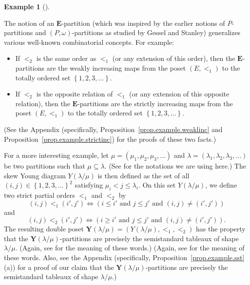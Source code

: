 \documentclass[numbers=enddot,12pt,final,onecolumn,notitlepage,abstracton]{scrartcl}
\theoremstyle{definition}
\newtheorem{exam}[theo]{Example}
\newenvironment{example}[1][]
{\begin{exam}[#1]\begin{leftbar}}
{\end{leftbar}\end{exam}}
\newenvironment{verlong}{}{}
\newenvironment{vershort}{}{}
\newcommand{\EE}{{\mathbf{E}}}
\begin{document}
\begin{example}
\label{exam.dp}
The notion of an $\EE$-partition (which was inspired by the earlier
notions of $P$-partitions and $\left(P,\omega\right)$-partitions
as studied by Gessel and Stanley\footnotemark)
generalizes various well-known
combinatorial concepts. For example:
\begin{itemize}
\item If $<_2$ is the same order
as $<_1$ (or any extension of this order), then the
$\EE$-partitions are the weakly increasing maps from the poset
$\left(E, <_1\right)$ to the totally ordered set
$\left\{1, 2, 3, \ldots\right\}$.
\item If $<_2$ is the opposite relation of
$<_1$ (or any extension of this opposite relation), then the
$\EE$-partitions are the strictly increasing maps from the
poset $\left(E, <_1\right)$ to the totally ordered set
$\left\{1, 2, 3, \ldots\right\}$.
\end{itemize}
\begin{verlong}
(See the Appendix
(specifically, Proposition~\ref{prop.example.weaklinc}
and Proposition~\ref{prop.example.strictinc})
for the proofs of these two facts.)
\end{verlong}

For a more interesting example,
let $\mu = \left(\mu_1, \mu_2, \mu_3, \ldots\right)$ and
$\lambda = \left(\lambda_1, \lambda_2, \lambda_3, \ldots\right)$ be
two partitions such that $\mu \subseteq \lambda$.
(See \cite[\S 2]{Reiner} for the notations we are using
here.)
The skew Young
diagram $Y\left(\lambda / \mu\right)$ is then defined as the set of all
$\left(i, j\right) \in \left\{ 1, 2, 3, \ldots \right\}^2$ satisfying
$\mu_i < j \leq \lambda_i$. On this set $Y\left(\lambda / \mu\right)$,
we define two strict partial orders $<_1$ and $<_2$ by
\[
\left(i,j\right) <_1 \left(i',j'\right) \Longleftrightarrow
\left( i \leq i' \text{ and } j \leq j' \text{ and }
\left(i,j\right) \neq \left(i',j'\right) \right)
\]
and
\[
\left(i,j\right) <_2 \left(i',j'\right) \Longleftrightarrow
\left( i \geq i' \text{ and } j \leq j' \text{ and }
\left(i,j\right) \neq \left(i',j'\right) \right) .
\]
The resulting double poset
$\mathbf{Y}\left(\lambda / \mu\right)
= \left(Y\left(\lambda / \mu\right), <_1, <_2\right)$ has the
property that the $\mathbf{Y}\left(\lambda / \mu\right)$-partitions
are precisely the semistandard tableaux of shape
$\lambda / \mu$.
\begin{vershort}
(Again, see \cite[\S 2]{Reiner} for the meaning
of these words.)
\end{vershort}
\begin{verlong}
(Again, see \cite[\S 2]{Reiner} for the meaning
of these words.
Also, see the Appendix
(specifically, Proposition~\ref{prop.example.sst} (a))
for a proof of our claim that the
$\mathbf{Y}\left(\lambda / \mu\right)$-partitions
are precisely the semistandard tableaux of shape
$\lambda / \mu$.)
\end{verlong}


\end{example}
\end{document}
